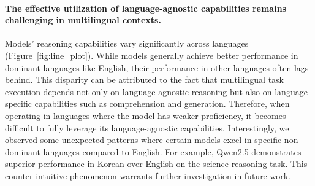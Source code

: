 \paragraph{The effective utilization of language-agnostic capabilities remains challenging in multilingual contexts.}
Models' reasoning capabilities vary significantly across languages (Figure~\ref{fig:line_plot}).
While models generally achieve better performance in dominant languages like English, their performance in other languages often lags behind.
This disparity can be attributed to the fact that multilingual task execution depends not only on language-agnostic reasoning but also on language-specific capabilities such as comprehension and generation.
Therefore, when operating in languages where the model has weaker proficiency, it becomes difficult to fully leverage its language-agnostic capabilities.
Interestingly, we observed some unexpected patterns where certain models excel in specific non-dominant languages compared to English.
For example, Qwen2.5 demonstrates superior performance in Korean over English on the science reasoning task.
This counter-intuitive phenomenon warrants further investigation in future work.


